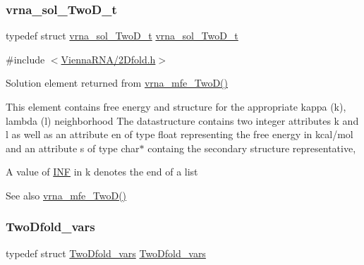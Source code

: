 \subsubsection{\texorpdfstring{vrna\+\_\+sol\+\_\+\+Two\+D\+\_\+t}{vrna\_sol\_TwoD\_t}}
{\footnotesize\ttfamily typedef struct \hyperlink{group__kl__neighborhood__mfe_structvrna__sol__TwoD__t}{vrna\+\_\+sol\+\_\+\+Two\+D\+\_\+t}  \hyperlink{group__kl__neighborhood__mfe_structvrna__sol__TwoD__t}{vrna\+\_\+sol\+\_\+\+Two\+D\+\_\+t}}



{\ttfamily \#include $<$\hyperlink{2Dfold_8h}{Vienna\+R\+N\+A/2\+Dfold.\+h}$>$}



Solution element returned from \hyperlink{group__kl__neighborhood__mfe_ga243c288b463147352829df04de6a2f77}{vrna\+\_\+mfe\+\_\+\+Two\+D()} 

This element contains free energy and structure for the appropriate kappa (k), lambda (l) neighborhood The datastructure contains two integer attributes \textquotesingle{}k\textquotesingle{} and \textquotesingle{}l\textquotesingle{} as well as an attribute \textquotesingle{}en\textquotesingle{} of type float representing the free energy in kcal/mol and an attribute \textquotesingle{}s\textquotesingle{} of type char$\ast$ containg the secondary structure representative,

A value of \hyperlink{constants_8h_a12c2040f25d8e3a7b9e1c2024c618cb6}{I\+NF} in k denotes the end of a list

\begin{DoxySeeAlso}{See also}
\hyperlink{group__kl__neighborhood__mfe_ga243c288b463147352829df04de6a2f77}{vrna\+\_\+mfe\+\_\+\+Two\+D()} 
\end{DoxySeeAlso}
\mbox{\label{group__kl__neighborhood__mfe_gaf4f514010a14f9d59d850742b3e96954}} 
\subsubsection{\texorpdfstring{Two\+Dfold\+\_\+vars}{TwoDfold\_vars}}
{\footnotesize\ttfamily typedef struct \hyperlink{group__kl__neighborhood__mfe_structTwoDfold__vars}{Two\+Dfold\+\_\+vars}  \hyperlink{group__kl__neighborhood__mfe_structTwoDfold__vars}{Two\+Dfold\+\_\+vars}}



